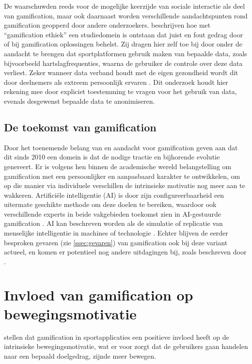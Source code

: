 De \textcite{Jong2010} waarschuwden reeds voor de mogelijke keerzijde van sociale interactie als deel van gamification, maar ook daarnaast worden verschillende aandachtspunten rond gamification geopperd door andere onderzoekers. \textcite{Hyrynsalmi2017} beschrijven hoe met “gamification ethiek” een studiedomein is ontstaan dat juist en fout gedrag door of bij gamification oplossingen behelst. Zij dragen hier zelf toe bij door onder de aandacht te brengen dat sportplatformen gebruik maken van bepaalde data, zoals bijvoorbeeld hartslagfrequenties, waarna de gebruiker de controle over deze data verliest. Zeker wanneer data verband houdt met de eigen gezondheid wordt dit door deelnemers als extreem persoonlijk ervaren \autocite{Hyrynsalmi2017}. Dit onderzoek houdt hier rekening mee door expliciet toestemming te vragen voor het gebruik van data, evenals desgewenst bepaalde data te anonimiseren.

\subsection{De toekomst van gamification}

Door het toenemende belang van en aandacht voor gamification geven \autocite{Bezzina2023} aan dat dit sinds 2010 een domein is dat de nodige tractie en bijhorende evolutie genereert. Er is volgens hen binnen de academische wereld belangstelling om gamification met een persoonlijker en aanpasbaard karakter te ontwikkelen, om op die manier via individuele verschillen de intrinsieke motivatie nog meer aan te wakkeren. Artificiële intelligentie (AI) is door zijn configureerbaarheid een uitermate geschikte methode om deze doelen te bereiken, waardoor ook verschillende experts in beide vakgebieden toekomst zien in AI-gestuurde gamification \autocite{Bezzina2023}. AI kan beschreven worden als de simulatie of replicatie van menselijke intelligentie in machines of technologie \autocite{Stewart2020}. Echter blijven de eerder besproken gevaren (zie \ref{ssec:gevaren}) van gamification ook bij deze variant actueel, en komen er potentieel nog andere uitdagingen bij, zoals beschreven door \textcite{Saghiri2022}.

\section{Invloed van gamification op bewegingsmotivatie}

\textcite{Kari2016} stellen dat gamification in sportapplicaties een positieve invloed heeft op de intrinsieke bewegingsmotivatie, wat er voor zorgt dat de gebruikers gaan handelen naar een bepaald doelgedrag, zijnde meer bewegen.

